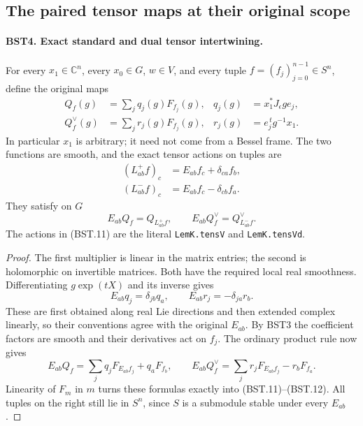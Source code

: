 \subsection{The paired tensor maps at their original scope}

\paragraph{BST4. Exact standard and dual tensor intertwining.}
\label{claim:BST4}
For every $x_1\in\mathbb C^n$, every $x_0\in G$, $w\in V$, and
every tuple $f=(f_j)_{j=0}^{n-1}\in S^n$, define the original maps
\[
 \begin{aligned}
 Q_f(g)&=\sum_j q_j(g)F_{f_j}(g),
       &q_j(g)&=x_1^*J_\epsilon ge_j,\\
 Q_f^\vee(g)&=\sum_j r_j(g)F_{f_j}(g),
       &r_j(g)&=e_j^{\,t}g^{-1}x_1.
 \end{aligned}
 \tag{BST.10}
\]
In particular $x_1$ is arbitrary; it need not come from a Bessel frame.
The two functions are smooth, and the exact tensor actions on tuples are
\[
 \begin{split}
 (L_{ab}^{+}f)_c&=E_{ab}f_c+\delta_{ca}f_b,\\
 (L_{ab}^{-}f)_c&=E_{ab}f_c-\delta_{cb}f_a.
 \end{split}
 \tag{BST.11}
\]
They satisfy on $G$
\[
                  E_{ab}Q_f=Q_{L_{ab}^{+}f},
 \qquad E_{ab}Q_f^\vee=Q_{L_{ab}^{-}f}^\vee .
 \tag{BST.12}
\]
The actions in (BST.11) are the literal \texttt{LemK.tensV}
and \texttt{LemK.tensVd}.

\begin{proof}
The first multiplier is linear in the matrix entries; the second is
holomorphic on invertible matrices.  Both have the required local
real smoothness.  Differentiating $g\exp(tX)$ and its inverse gives
\[
 E_{ab}q_j=\delta_{jb}q_a,\qquad
 E_{ab}r_j=-\delta_{ja}r_b.
 \tag{BST.13}
\]
These are first obtained along real Lie directions and then extended
complex linearly, so their conventions agree with the original
$E_{ab}$.  By BST3 the coefficient factors are smooth and their
derivatives act on $f_j$.
The ordinary product rule now gives
\[
 E_{ab}Q_f=\sum_jq_jF_{E_{ab}f_j}+q_aF_{f_b},\qquad
 E_{ab}Q_f^\vee=\sum_jr_jF_{E_{ab}f_j}-r_bF_{f_a}.
 \tag{BST.14}
\]
Linearity of $F_m$ in $m$ turns these formulas exactly into
(BST.11)--(BST.12).  All tuples on the right still lie in $S^n$,
since $S$ is a submodule stable under every $E_{ab}$.
\end{proof}


